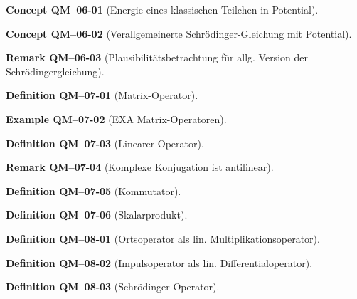 \documentclass[10pt, letterpaper]{article}
\newcommand{\CustomHeading}[3]{%
  \par\medskip\noindent%
  \textbf{#1 #2} \textnormal{(#3)}.\enskip%
}
\newenvironment{DEF}[2]{\CustomHeading{Definition}{#1}{#2}}{}
\newenvironment{REM}[2]{\CustomHeading{Remark}{#1}{#2}}{}
\newenvironment{EXA}[2]{\CustomHeading{Example}{#1}{#2}}{}
\newenvironment{CONC}[2]{\CustomHeading{Concept}{#1}{#2}}{}
\begin{document}
\begin{CONC}{QM--06-01}{Energie eines klassischen Teilchen in Potential}
\end{CONC}

\begin{CONC}{QM--06-02}{Verallgemeinerte Schrödinger-Gleichung mit Potential}
\end{CONC}

\begin{REM}{QM--06-03}{Plausibilitätsbetrachtung für allg. Version der Schrödingergleichung}
\end{REM}

\begin{DEF}{QM--07-01}{Matrix-Operator}
\end{DEF}

\begin{EXA}{QM--07-02}{EXA Matrix-Operatoren}
\end{EXA}

\begin{DEF}{QM--07-03}{Linearer Operator}
\end{DEF}

\begin{REM}{QM--07-04}{Komplexe Konjugation ist antilinear}
\end{REM}

\begin{DEF}{QM--07-05}{Kommutator}
\end{DEF}

\begin{DEF}{QM--07-06}{Skalarprodukt}
\end{DEF}

\begin{DEF}{QM--08-01}{Ortsoperator als lin. Multiplikationsoperator}
\end{DEF}

\begin{DEF}{QM--08-02}{Impulsoperator als lin. Differentialoperator}
\end{DEF}

\begin{DEF}{QM--08-03}{Schrödinger Operator}
\end{DEF}
\end{document}
